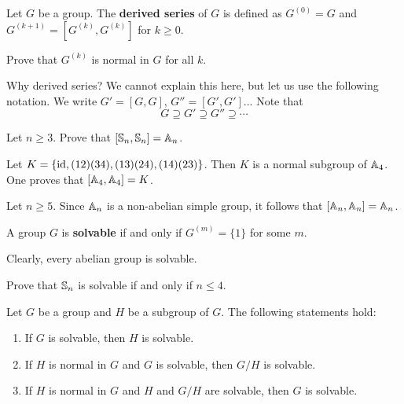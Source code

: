 \begin{definition}
    Let $G$ be a group. The \textbf{derived series} of $G$ 
    is defined as $G^{(0)}=G$ and
    $G^{(k+1)}=[G^{(k)},G^{(k)}]$ for $k\geq 0$. 
\end{definition}

\begin{exercise}
    Prove that $G^{(k)}$ is normal in $G$ for all $k$. 
\end{exercise}

Why derived series? We cannot explain this here, but let us use the following
notation. 
We write $G'=[G,G]$, $G''=[G',G']$... 
Note that 
\[
G\supseteq G'\supseteq G''\supseteq\cdots
\]


\begin{exercise}
    Let $n\geq3$. Prove that 
    $[\mathbb{S}_n,\mathbb{S}_n]=\mathbb{A}_n$. 
\end{exercise}

\begin{example}
    Let $K=\{\operatorname{id},(12)(34),(13)(24),(14)(23)\}$. Then 
    $K$ is a normal subgroup of $\mathbb{A}_4$. 
    One proves that $[\mathbb{A}_4,\mathbb{A}_4]=K$. 
\end{example}

\begin{example}
    Let $n\geq5$. Since $\mathbb{A}_n$ is a non-abelian simple group, 
    it follows that $[\mathbb{A}_n,\mathbb{A}_n]=\mathbb{A}_n$. 
\end{example}

\begin{definition}
    A group $G$ is \textbf{solvable} if and only if
    $G^{(m)}=\{1\}$ for some $m$. 
\end{definition}

Clearly, every abelian group is solvable. 

\begin{exercise}
    Prove that $\mathbb{S}_n$ is solvable if and only if $n\leq4$. 
\end{exercise}

\begin{proposition}
\label{pro:solvable}
    Let $G$ be a group and $H$ be a subgroup of $G$. 
    The following statements hold:
    \begin{enumerate}
        \item If $G$ is solvable, then $H$ is solvable.
        \item If $H$ is normal in $G$ and $G$ is solvable, then $G/H$ is solvable. 
        \item If $H$ is normal in $G$ and $H$ and $G/H$ are solvable, then $G$ is solvable. 
    \end{enumerate}
\end{proposition}

